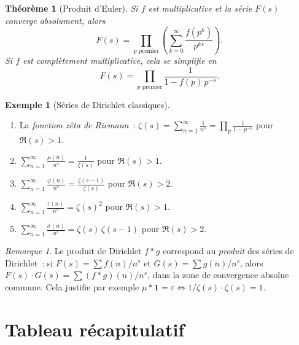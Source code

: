 \documentclass[12pt,a4paper,openany]{book}
\theoremstyle{definition}
\newtheorem{exemple}[definition]{Exemple}
\theoremstyle{plain}
\newtheorem{theoreme}[definition]{Théorème}
\theoremstyle{remark}
\newtheorem{remarque}[definition]{Remarque}
\begin{document}
\begin{theoreme}[Produit d'Euler]
\label{thm:produit-euler}
Si $f$ est multiplicative et la série $F(s)$ converge absolument, alors
\[
  F(s) = \prod_{p \text{ premier}} \left(\sum_{k=0}^{\infty}
    \frac{f(p^k)}{p^{ks}}\right).
\]
Si $f$ est complètement multiplicative, cela se simplifie en
\[
  F(s) = \prod_{p \text{ premier}} \frac{1}{1 - f(p)\, p^{-s}}.
\]
\end{theoreme}

\begin{exemple}[Séries de Dirichlet classiques]
\label{ex:series-dirichlet-classiques}
\begin{enumerate}[label=(\alph*)]
  \item La \emph{fonction zêta de Riemann}~:
    $\displaystyle\zeta(s) = \sum_{n=1}^{\infty} \frac{1}{n^s}
    = \prod_p \frac{1}{1 - p^{-s}}$ pour $\Re(s) > 1$.
  \item $\displaystyle\sum_{n=1}^{\infty} \frac{\mu(n)}{n^s} = \frac{1}{\zeta(s)}$
    pour $\Re(s) > 1$.
  \item $\displaystyle\sum_{n=1}^{\infty} \frac{\varphi(n)}{n^s}
    = \frac{\zeta(s-1)}{\zeta(s)}$ pour $\Re(s) > 2$.
  \item $\displaystyle\sum_{n=1}^{\infty} \frac{\tau(n)}{n^s} = \zeta(s)^2$
    pour $\Re(s) > 1$.
  \item $\displaystyle\sum_{n=1}^{\infty} \frac{\sigma(n)}{n^s}
    = \zeta(s)\,\zeta(s-1)$ pour $\Re(s) > 2$.
\end{enumerate}
\end{exemple}

\begin{remarque}
\label{rem:convolution-series}
Le produit de Dirichlet $f * g$ correspond au \emph{produit} des séries de Dirichlet~: si
$F(s) = \sum f(n)/n^s$ et $G(s) = \sum g(n)/n^s$, alors
$F(s) \cdot G(s) = \sum (f*g)(n)/n^s$, dans la zone de convergence absolue commune. Cela
justifie par exemple $\mu * \mathbf{1} = \varepsilon \Leftrightarrow
1/\zeta(s) \cdot \zeta(s) = 1$.
\end{remarque}

\section{Tableau récapitulatif}
\label{sec:tableau-fonctions}
\end{document}
